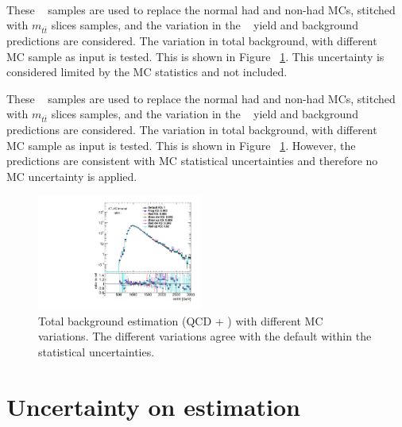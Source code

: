 \paragraph{}
These \ttbar~ samples are used to replace the normal had and non-had MCs, stitched with $m_{t\bar{t}}$ slices samples, and the variation in the \ttbar~ yield and background predictions are considered. 
The variation in total background, with different \ttbar~ MC sample as input is tested. 
This is shown in Figure ~\ref{fig:ttbar-MC}. 
This uncertainty is considered limited by the MC statistics and not included.

These \ttbar~ samples are used to replace the normal had and non-had MCs, stitched with $m_{t\bar{t}}$ slices samples, and the variation in the \ttbar~ yield and background predictions are considered. 
The variation in total background, with different \ttbar~ MC sample as input is tested. 
This is shown in Figure ~\ref{fig:ttbar-MC}. 
However, the predictions are consistent with MC statistical uncertainties and therefore no \ttbar~ MC uncertainty is applied.

\begin{figure}[htbp!]
\begin{center} 
\includegraphics[width=0.48\textwidth,angle=-90]{figures/boosted/Other/directcompare_mHH_l_1_TwoTag_split_Top_syst_stat_postfit_all_.pdf}
\caption{Total background estimation (QCD + \ttbar) with different \ttbar MC variations. The different variations agree with the default within the statistical uncertainties.}
\label{fig:ttbar-MC}
\end{center}
\end{figure}



\section{Uncertainty on \muqcd estimation}
\label{sec:non-closure-mu-qcd}


